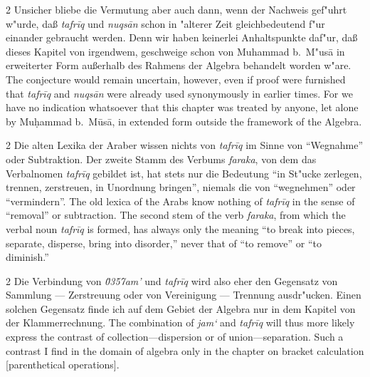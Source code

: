 \documentclass[10pt,a4paper]{article}
\renewcommand{\switchcolumn}{\syncronize\nointerlineskip\columnbreak}
\newcommand{\enquote}[1]{``#1''}
\begin{document}
\begin{paracol}{2}
Unsicher bliebe die Vermutung aber auch dann, wenn der Nachweis gef"uhrt w"urde, da\ss{} \textit{tafr\={i}q} und \textit{nuqs\=an} schon in "alterer Zeit gleichbedeutend f"ur einander gebraucht werden. Denn wir haben keinerlei Anhaltspunkte daf"ur, da\ss{} dieses Kapitel von irgendwem, geschweige schon von Muhammad b.\ M"us\=a in erweiterter Form au\ss{}erhalb des Rahmens der Algebra behandelt worden w"are.
\switchcolumn
The conjecture would remain uncertain, however, even if proof were furnished that \textit{tafr\={i}q} and \textit{nuqs\=an} were already used synonymously in earlier times. For we have no indication whatsoever that this chapter was treated by anyone, let alone by Mu\d{h}ammad b.\ M\=us\=a, in extended form outside the framework of the Algebra.
\end{paracol}

\begin{paracol}{2}
Die alten Lexika der Araber wissen nichts von \textit{tafr\={i}q} im Sinne von \enquote{Wegnahme} oder Subtraktion. Der zweite Stamm des Verbums \textit{faraka}, von dem das Verbalnomen \textit{tafr\={i}q} gebildet ist, hat stets nur die Bedeutung \enquote{in St"ucke zerlegen, trennen, zerstreuen, in Unordnung bringen}, niemals die von \enquote{wegnehmen} oder \enquote{vermindern}.
\switchcolumn
The old lexica of the Arabs know nothing of \textit{tafr\={i}q} in the sense of ``removal'' or subtraction. The second stem of the verb \textit{faraka}, from which the verbal noun \textit{tafr\={i}q} is formed, has always only the meaning ``to break into pieces, separate, disperse, bring into disorder,'' never that of ``to remove'' or ``to diminish.''
\end{paracol}

\begin{paracol}{2}
Die Verbindung von \textit{\u0357{}am'} und \textit{tafr\={i}q} wird also eher den Gegensatz von Sammlung --- Zerstreuung oder von Vereinigung --- Trennung ausdr"ucken. Einen solchen Gegensatz finde ich auf dem Gebiet der Algebra nur in dem Kapitel von der Klammerrechnung.
\switchcolumn
The combination of \textit{jam`} and \textit{tafr\={i}q} will thus more likely express the contrast of collection---dispersion or of union---separation. Such a contrast I find in the domain of algebra only in the chapter on bracket calculation [parenthetical operations].
\end{paracol}
\end{document}
